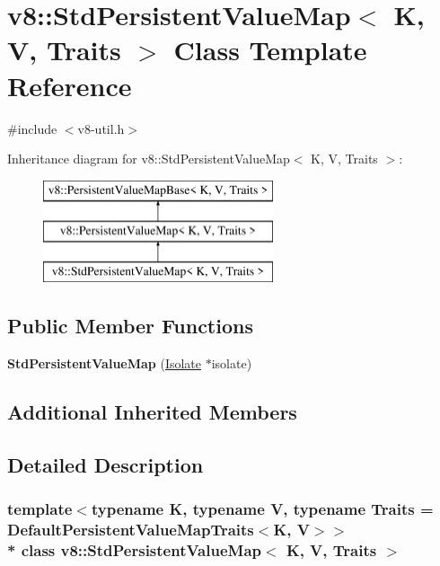 \hypertarget{classv8_1_1_std_persistent_value_map}{}\section{v8\+:\+:Std\+Persistent\+Value\+Map$<$ K, V, Traits $>$ Class Template Reference}
\label{classv8_1_1_std_persistent_value_map}


{\ttfamily \#include $<$v8-\/util.\+h$>$}

Inheritance diagram for v8\+:\+:Std\+Persistent\+Value\+Map$<$ K, V, Traits $>$\+:\begin{figure}[H]
\begin{center}
\leavevmode
\includegraphics[height=3.000000cm]{classv8_1_1_std_persistent_value_map}
\end{center}
\end{figure}
\subsection*{Public Member Functions}
\begin{DoxyCompactItemize}
\item 
{\bfseries Std\+Persistent\+Value\+Map} (\hyperlink{classv8_1_1_isolate}{Isolate} $\ast$isolate)\hypertarget{classv8_1_1_std_persistent_value_map_a44d7222a863267780db07c882056f73b}{}\label{classv8_1_1_std_persistent_value_map_a44d7222a863267780db07c882056f73b}

\end{DoxyCompactItemize}
\subsection*{Additional Inherited Members}


\subsection{Detailed Description}
\subsubsection*{template$<$typename K, typename V, typename Traits = Default\+Persistent\+Value\+Map\+Traits$<$\+K, V$>$$>$\\*
class v8\+::\+Std\+Persistent\+Value\+Map$<$ K, V, Traits $>$}

